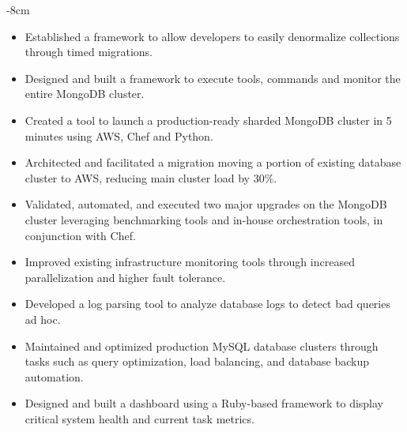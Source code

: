 \documentclass[10pt,a4paper,academicons]{altacv}
\begin{document}

\begin{adjustwidth}{}{-8cm}
\makecvheader
\end{adjustwidth}


\begin{itemize}
\item Established a framework to allow developers to easily denormalize collections through timed migrations.
\item Designed and built a framework to execute tools, commands and monitor the entire MongoDB cluster.
\item Created a tool to launch a production-ready sharded MongoDB cluster in 5
    minutes using AWS, Chef and Python.
\item Architected and facilitated a migration moving a portion of existing
    database cluster to AWS, reducing main cluster load by 30\%.   
\item Validated, automated, and executed two major upgrades on the MongoDB
    cluster leveraging benchmarking tools and in-house orchestration tools, in
        conjunction with Chef.
\item Improved existing infrastructure monitoring tools through increased parallelization and higher fault tolerance.
\item Developed a log parsing tool to analyze database logs to detect bad queries ad hoc.
\end{itemize}

\divider

\begin{itemize}
\item Maintained and optimized production MySQL database clusters through tasks such as query optimization, load balancing, and database backup automation.
\item Designed and built a dashboard using a Ruby-based framework to display critical system health and current task metrics.
\end{itemize}

\divider
\end{document}
